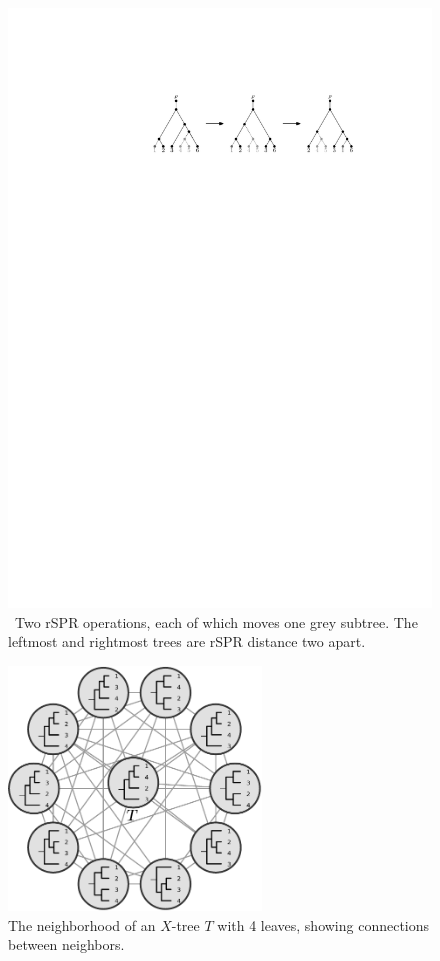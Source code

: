 \documentclass[11pt]{amsart}
\let\MYoriglatexcaption\caption
\renewcommand{\caption}[2][\relax]{\MYoriglatexcaption[#2]{#2}}
\begin{document}
\begin{figure}
	\includegraphics[scale=1.25]{figs/two-spr}
	\caption{\
    Two rSPR operations, each of which moves one grey subtree.
    The leftmost and rightmost trees are rSPR distance two apart.}
	\label{fig:two-spr}
\end{figure}

\begin{figure}
	\includegraphics[width=0.6\textwidth]{figs/neighborhood}
	\hspace*{\stretch{1}}
	\caption{The neighborhood of an $X$-tree $T$ with 4 leaves, showing connections between neighbors.}
	\label{fig:neighborhood}
\end{figure}
\end{document}
